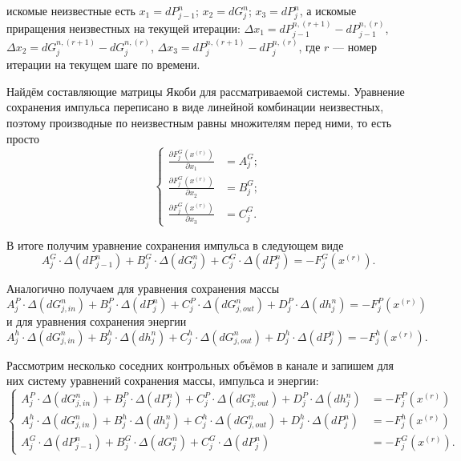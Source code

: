 \noindent искомые неизвестные есть $x_1=dP_{j-1}^n$; $x_2=dG_j^n$; $x_3=dP_j^n$, а искомые приращения неизвестных на текущей итерации: $\Delta x_1=dP_{j-1}^{n,(r+1)}-dP_{j-1}^{n,(r)}$, $\Delta x_2=dG_j^{n,(r+1)}-dG_j^{n,(r)}$, $\Delta x_3=dP_j^{n,(r+1)}-dP_j^{n,(r)}$, где $r$ --- номер итерации на текущем шаге по времени. 

Найдём составляющие матрицы Якоби для рассматриваемой системы. Уравнение сохранения импульса переписано в виде линейной комбинации неизвестных, поэтому производные по неизвестным равны множителям перед ними, то есть просто
\begin{equation}
\label{formula510}
\left\{
\begin{aligned}
\frac{\partial F_j^G(x^{(r)})}{\partial x_1} & = A_j^G; \\
\frac{\partial F_j^G(x^{(r)})}{\partial x_2} & = B_j^G; \\
\frac{\partial F_j^G(x^{(r)})}{\partial x_3} & = C_j^G.
\end{aligned}
\right.
\end{equation}

В итоге получим уравнение сохранения импульса в следующем виде
\begin{equation}
\label{formula511}
A_j^G \cdot \Delta(dP_{j-1}^n)+B_j^G \cdot \Delta(dG_j^n) + C_j^G \cdot \Delta(dP_j^n) = -F_j^G(x^{(r)}). 
\end{equation}

Аналогично получаем для уравнения сохранения массы
\begin{equation}
\label{formula512}
A_j^P \cdot \Delta(dG_{j,in}^n)+B_j^P \cdot \Delta(dP_j^n) + C_j^P \cdot \Delta(dG_{j,out}^n) + D_j^P \cdot \Delta(dh_j^n) = -F_j^P(x^{(r)}) 
\end{equation}
и для уравнения сохранения энергии
\begin{equation}
\label{formula513}
A_j^h \cdot \Delta(dG_{j,in}^n)+B_j^h \cdot \Delta(dh_j^n) + C_j^h \cdot \Delta(dG_{j,out}^n) + D_j^h \cdot \Delta(dP_j^n) = -F_j^h(x^{(r)}). 
\end{equation}

Рассмотрим несколько соседних контрольных объёмов в канале и запишем для них систему уравнений сохранения массы, импульса и энергии:
\begin{equation}
\label{formula514}
\left\{
\begin{aligned}
A_j^P \cdot \Delta(dG_{j,in}^n)+B_j^P \cdot \Delta(dP_j^n) + C_j^P \cdot \Delta(dG_{j,out}^n) + D_j^P \cdot \Delta(dh_j^n) & = -F_j^P(x^{(r)}) \\
A_j^h \cdot \Delta(dG_{j,in}^n)+B_j^h \cdot \Delta(dh_j^n) + C_j^h \cdot \Delta(dG_{j,out}^n) + D_j^h \cdot \Delta(dP_j^n) & = -F_j^h(x^{(r)}) \\
A_j^G \cdot \Delta(dP_{j-1}^n)+B_j^G \cdot \Delta(dG_j^n) + C_j^G \cdot \Delta(dP_j^n) & = -F_j^G(x^{(r)}).
\end{aligned}
\right.
\end{equation}

